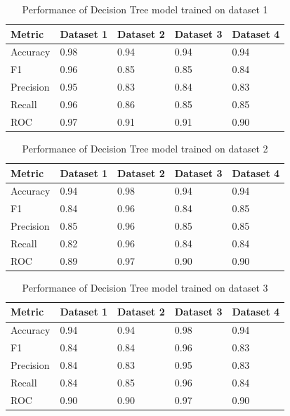 \begin{table}[hbt]
\caption{Performance of Decision Tree model trained on dataset 1}\label{tab:performance_of_decision_tree_model_trained_on_dataset_1}
\begin{tabular*}{\tblwidth}{@{}LLLLL@{}}
\toprule
    Metric & Dataset 1 & Dataset 2 & Dataset 3 & Dataset 4 \\
\midrule
    Accuracy & 0.98 & 0.94 & 0.94 & 0.94 \\
    F1 & 0.96 & 0.85 & 0.85 & 0.84 \\
    Precision & 0.95 & 0.83 & 0.84 & 0.83 \\
    Recall & 0.96 & 0.86 & 0.85 & 0.85 \\
    ROC & 0.97 & 0.91 & 0.91 & 0.90 \\
\bottomrule
\end{tabular*}
\end{table}

\begin{table}[hbt]
\caption{Performance of Decision Tree model trained on dataset 2}\label{tab:performance_of_decision_tree_model_trained_on_dataset_2}
\begin{tabular*}{\tblwidth}{@{}LLLLL@{}}
\toprule
    Metric & Dataset 1 & Dataset 2 & Dataset 3 & Dataset 4 \\
\midrule
    Accuracy & 0.94 & 0.98 & 0.94 & 0.94 \\
    F1 & 0.84 & 0.96 & 0.84 & 0.85 \\
    Precision & 0.85 & 0.96 & 0.85 & 0.85 \\
    Recall & 0.82 & 0.96 & 0.84 & 0.84 \\
    ROC & 0.89 & 0.97 & 0.90 & 0.90 \\
\bottomrule
\end{tabular*}
\end{table}

\begin{table}[hbt]
\caption{Performance of Decision Tree model trained on dataset 3}\label{tab:performance_of_decision_tree_model_trained_on_dataset_3}
\begin{tabular*}{\tblwidth}{@{}LLLLL@{}}
\toprule
    Metric & Dataset 1 & Dataset 2 & Dataset 3 & Dataset 4 \\
\midrule
    Accuracy & 0.94 & 0.94 & 0.98 & 0.94 \\
    F1 & 0.84 & 0.84 & 0.96 & 0.83 \\
    Precision & 0.84 & 0.83 & 0.95 & 0.83 \\
    Recall & 0.84 & 0.85 & 0.96 & 0.84 \\
    ROC & 0.90 & 0.90 & 0.97 & 0.90 \\
\bottomrule
\end{tabular*}
\end{table}

